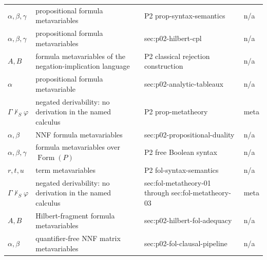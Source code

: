 \begin{longtable}{@{}p{}p{}p{}p{}@{}}
\(\alpha,\allowbreak \beta,\allowbreak \gamma\) & propositional formula metavariables & P2 prop-\allowbreak{}syntax-\allowbreak{}semantics & n/a \\
\(\alpha,\allowbreak \beta,\allowbreak \gamma\) & propositional formula metavariables & sec:\allowbreak{}p02-\allowbreak{}hilbert-\allowbreak{}cpl & n/a \\
\(A,\allowbreak B\) & formula metavariables of the negation-implication language & P2 classical rejection construction & n/a \\
\(\alpha\) & propositional formula metavariable & sec:\allowbreak{}p02-\allowbreak{}analytic-\allowbreak{}tableaux & n/a \\
\(\Gamma\nvdash_{S}\varphi\) & negated derivability: no derivation in the named calculus & P2 prop-\allowbreak{}metatheory & meta \\
\(\alpha,\allowbreak \beta\) & NNF formula metavariables & sec:\allowbreak{}p02-\allowbreak{}propositional-\allowbreak{}duality & n/a \\
\(\alpha,\allowbreak \beta,\allowbreak \gamma\) & formula metavariables over \(\operatorname{Form}(P)\) & P2 free Boolean syntax & n/a \\
\(r,\allowbreak t,\allowbreak u\) & term metavariables & P2 fol-\allowbreak{}syntax-\allowbreak{}semantics & n/a \\
\(\Gamma\nvdash_{S}\varphi\) & negated derivability: no derivation in the named calculus & sec:\allowbreak{}fol-\allowbreak{}metatheory-\allowbreak{}01 through sec:\allowbreak{}fol-\allowbreak{}metatheory-\allowbreak{}03 & meta \\
\(A,\allowbreak B\) & Hilbert-fragment formula metavariables & sec:\allowbreak{}p02-\allowbreak{}hilbert-\allowbreak{}fol-\allowbreak{}adequacy & n/a \\
\(\alpha,\allowbreak \beta\) & quantifier-free NNF matrix metavariables & sec:\allowbreak{}p02-\allowbreak{}fol-\allowbreak{}clausal-\allowbreak{}pipeline & n/a \\
\end{longtable}
\endgroup
